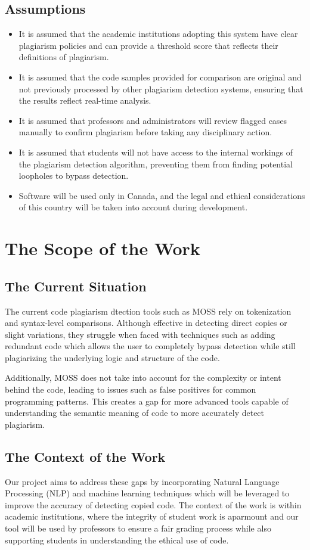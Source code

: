 \documentclass[12pt]{article}
\begin{document}
\subsection{Assumptions}
\begin{itemize}
  \item It is assumed that the academic institutions adopting this system have clear plagiarism policies and can provide a threshold score that reflects their definitions of plagiarism.
  \item It is assumed that the code samples provided for comparison are original and not previously processed by other plagiarism detection systems, ensuring that the results reflect real-time analysis.
  \item It is assumed that professors and administrators will review flagged cases manually to confirm plagiarism before taking any disciplinary action.
  \item It is assumed that students will not have access to the internal workings of the plagiarism detection algorithm, preventing them from finding potential loopholes to bypass detection.
  \item Software will be used only in Canada, and the legal and ethical considerations of this country will be taken into account during development.
\end{itemize}

\section{The Scope of the Work}
\subsection{The Current Situation}
The current code plagiarism dtection tools such as MOSS rely on tokenization and syntax-level comparisons. Although effective
in detecting direct copies or slight variations, they struggle when faced with techniques such as adding redundant code which
allows the user to completely bypass detection while still plagiarizing the underlying logic and structure of the code.

Additionally, MOSS does not take into account for the complexity or intent behind the code, leading to issues such as false
positives for common programming patterns. This creates a gap for more advanced tools capable of understanding the semantic 
meaning of code to more accurately detect plagiarism.
\subsection{The Context of the Work}
Our project aims to address these gaps by incorporating Natural Language Processing (NLP) and machine learning techniques
which will be leveraged to improve the accuracy of detecting copied code. The context of the work is within academic institutions,
where the integrity of student work is aparmount and our tool will be used by professors to ensure a fair grading process
while also supporting students in understanding the ethical use of code.
\end{document}
